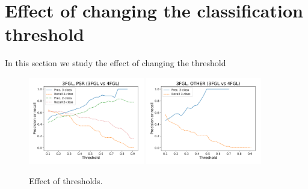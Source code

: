 \section{Effect of changing the classification threshold}


In this section we study the effect of changing the threshold



\begin{figure}[h]
\centering
\hspace*{-0.5cm}
\includegraphics[width=0.45\textwidth]{plots/thresholds/thresholds_prec_recall_3FGL_vs_4FGL-DR2_PSR.pdf}
\includegraphics[width=0.45\textwidth]{plots/thresholds/thresholds_prec_recall_3FGL_vs_4FGL-DR2_OTHER.pdf}
\caption{Effect of thresholds.
}
\label{fig:thres_3_vs_4}
\end{figure}


